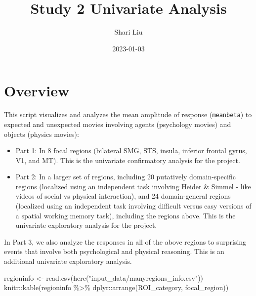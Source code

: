 \documentclass[
]{article}
\title{Study 2 Univariate Analysis}
\author{Shari Liu}
\date{2023-01-03}
\newenvironment{Shaded}{\begin{snugshade}}{\end{snugshade}}
\newcommand{\FunctionTok}[1]{\textcolor[rgb]{0.00,0.00,0.00}{#1}}
\newcommand{\NormalTok}[1]{#1}
\newcommand{\OtherTok}[1]{\textcolor[rgb]{0.56,0.35,0.01}{#1}}
\newcommand{\SpecialCharTok}[1]{\textcolor[rgb]{0.00,0.00,0.00}{#1}}
\newcommand{\StringTok}[1]{\textcolor[rgb]{0.31,0.60,0.02}{#1}}
\providecommand{\tightlist}{%
  \setlength{\itemsep}{0pt}\setlength{\parskip}{0pt}}
\begin{document}
\maketitle

\hypertarget{overview}{%
\section{Overview}\label{overview}}

This script visualizes and analyzes the mean amplitude of response
(\texttt{meanbeta}) to expected and unexpected movies involving agents
(psychology movies) and objects (physics movies):

\begin{itemize}
\tightlist
\item
  Part 1: In 8 focal regions (bilateral SMG, STS, insula, inferior
  frontal gyrus, V1, and MT). This is the univariate confirmatory
  analysis for the project.
\item
  Part 2: In a larger set of regions, including 20 putatively
  domain-specific regions (localized using an independent task involving
  Heider \& Simmel - like videos of social vs physical interaction), and
  24 domain-general regions (localized using an independent task
  involving difficult versus easy versions of a spatial working memory
  task), including the regions above. This is the univariate exploratory
  analysis for the project.
\end{itemize}

In Part 3, we also analyze the responses in all of the above regions to
surprising events that involve both psychological and physical
reasoning. This is an additional univariate exploratory analysis.

\begin{Shaded}
\begin{Highlighting}[]
\NormalTok{regioninfo }\OtherTok{\textless{}{-}} \FunctionTok{read.csv}\NormalTok{(}\FunctionTok{here}\NormalTok{(}\StringTok{"input\_data/manyregions\_info.csv"}\NormalTok{)) }
\NormalTok{knitr}\SpecialCharTok{::}\FunctionTok{kable}\NormalTok{(regioninfo }\SpecialCharTok{\%\textgreater{}\%}\NormalTok{ dplyr}\SpecialCharTok{::}\FunctionTok{arrange}\NormalTok{(ROI\_category, focal\_region))}
\end{Highlighting}
\end{Shaded}
\end{document}
